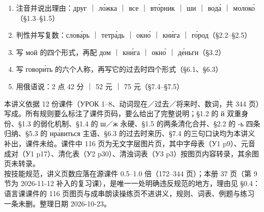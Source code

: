 \clearpage
{}

\begin{minipage}{\linewidth}
\begin{enumerate}[label=\textbf{\arabic*.}]
\item 注音并说出理由：друг ｜ ло́жка ｜ все ｜ вто́рник ｜ ши ｜ вода́ ｜ молоко́（\S1.3--\S1.5）
\item 判性并写复数：слова́рь ｜ тетра́дь ｜ окно́ ｜ кни́га ｜ го́род（\S2.2--\S2.5）
\item 写 мой 的四个形式，再配 дом ｜ кни́га ｜ окно́ ｜ де́ньги（\S3.2）
\item 写 говори́ть 的六个人称，再写它的过去时四个形式（\S6.1、\S6.3）
\item 用俄语说：2 点 42 分 ｜ 52 元 ｜ 75 元（\S7.4--\S7.5）
\end{enumerate}
\end{minipage}

\flowerrule

\begin{minipage}{\linewidth}
{\small\color{inkgray}
本讲义依据 12 份课件（УРОК 1--8、动词现在／过去／将来时、数词，共 344 页）写成。所有规则要么标注了课件页码，要么给出了完整说明；\S1.2 的 й 双重身份、\S1.3 的弱化机制、\S1.4 的 ш／ж 永硬、\S1.5 的两条清化合并、\S2.2 的 -ь 四条归纳、\S5.3 的 нра́виться 主语、\S6.3 的过去时来历、\S7.4 的三句口诀均为本讲义补出，课件未给。课件中 116 页为无文字层图片页，其中字母表（У1 p9）、元音成对（У1 p17）、清化表（У2 p30）、清浊词表（У3 p3）按图页内容转录，其余图页未转录。\\
按技能规范，讲义页数应落在源课件 0.5--1.0 倍（172--344 页）；本册 37 页（第 9 节为 2026-11-12 补入的复习课），是唯一一处明确违反规范的地方，理由见 \S0.4：语言课课件的 116 页图页与成串朗读操练页不进讲义，规则、词表、例题与练习一条未删。整理日期 2026-10-23。}
\end{minipage}
